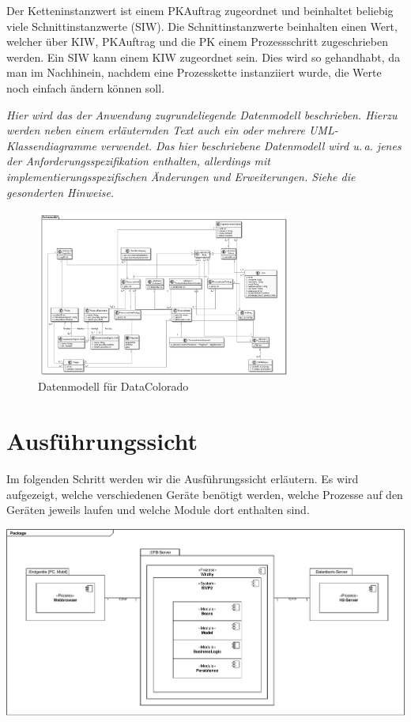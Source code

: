 \documentclass[enabledeprecatedfontcommands,fontsize=12pt,paper=a4,twoside]{scrartcl}
\begin{document}
{{Der Ketteninstanzwert ist einem PKAuftrag zugeordnet und beinhaltet beliebig viele Schnittinstanzwerte (SIW). Die Schnittinstanzwerte beinhalten einen Wert, welcher über KIW, PKAuftrag und die PK einem Prozessschritt zugeschrieben werden. Ein SIW kann einem KIW zugeordnet sein. 
Dies wird so gehandhabt, da man im Nachhinein, nachdem eine Prozesskette instanziiert wurde, die Werte noch einfach ändern können soll.
}

{\it Hier wird das der Anwendung zugrundeliegende Datenmodell
  beschrieben. Hierzu werden neben einem erläuternden Text auch ein
  oder mehrere {UML}-Klassendiagramme verwendet. Das hier beschriebene
  Datenmodell wird u.\,a. jenes der Anforderungsspezifikation enthalten,
  allerdings mit implementierungsspezifischen Änderungen und
  Erweiterungen. Siehe die gesonderten Hinweise.}
   
 \begin{figure}
  \caption{Datenmodell für DataColorado}
  \centering
  

  \includegraphics[width=0.75\textwidth]{UML/datenModel}

 \end{figure}

\section{Ausführungssicht}

\label{sec:ausfuehrung}


{ Im folgenden Schritt werden wir die Ausführungssicht erläutern. Es wird aufgezeigt, welche verschiedenen Geräte benötigt werden, welche Prozesse auf den Geräten jeweils laufen und welche Module dort enthalten sind.
}


\includegraphics[scale=0.5]{UML/06Ausfuehrungssicht.pdf}


}
\end{document}
